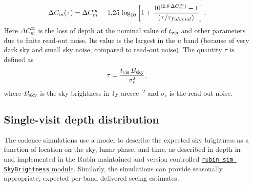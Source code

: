 \documentclass[PST,authoryear,toc]{lsstdoc}
\newcommand{\cm}{\ensuremath{C_m}}
\begin{document}
\begin{equation}
\label{eq:dCm}
 \Delta C_m(\tau) = \Delta C^\infty_m - 1.25\,\log_{10}\left[1 + {10^{(0.8 \, \Delta C^\infty_m)} - 1 \over (\tau / \tau_{fiducial})}  \right].
\end{equation}
Here $\Delta C^\infty_m$ is the loss of depth at the nominal value of $t_{\rm vis}$ and
other parameters due to finite read-out noise. 
Its value is the largest in the $u$ band (because of very dark sky and small sky 
noise, compared to read-out noise). The quantity $\tau$ is defined as
\begin{equation}
        \tau =  {t_{\rm vis}\, B_{\rm sky} \over \sigma^2_{r}},
\end{equation}
where $B_{\rm sky}$ is the sky brightness in Jy arcsec$^{-2}$ and $\sigma_{r}$ is the read-out noise.  


\subsection{Single-visit depth distribution}\label{sec:singlevisit}

 
The cadence simulations use a model to describe the expected sky brightness as a function of location on the sky, lunar phase, and time, as described in depth in \href{https://www.osti.gov/biblio/1784946}{{\citet{osti_1784946}}} and implemented in the Rubin maintained and version controlled
\href{https://github.com/lsst/rubin_sim/tree/main/rubin_sim/skybrightness}{{\tt rubin\_sim SkyBrightness} module}. 
Similarly, the simulations can provide seasonally appropriate, expected per-band delivered seeing estimates. %
 
\end{document}
